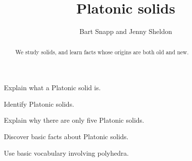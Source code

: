 \documentclass[noauthor,nooutcomes,hints,handout]{ximera}
\title{Platonic solids}
\author{Bart Snapp and Jenny Sheldon}
\begin{document}
\begin{abstract}
  We study solids, and learn facts whose origins are both old and new.
\end{abstract}
\maketitle

\begin{listOutcomes}
\item Explain what a Platonic solid is.
\item Identify Platonic solids.
\item Explain why there are only five Platonic solids.
\item Discover basic facts about Platonic solids.
\item Use basic vocabulary involving polyhedra.
\end{listOutcomes}
\end{document}
